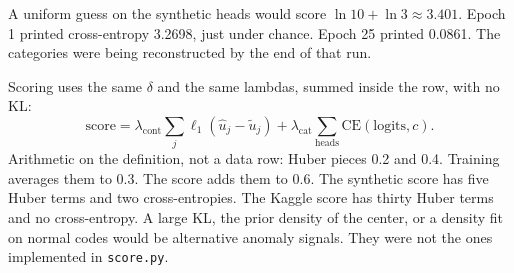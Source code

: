 \documentclass[11pt]{article}
\begin{document}
A uniform guess on the synthetic heads would score
$\ln 10 + \ln 3 \approx 3.401$. Epoch 1 printed cross-entropy 3.2698,
just under chance. Epoch 25 printed 0.0861. The categories were being
reconstructed by the end of that run.

Scoring uses the same $\delta$ and the same lambdas, summed inside the
row, with no KL:
\begin{equation}
\label{eq:score}
\mathrm{score}
= \lambda_{\mathrm{cont}}\sum_{j}\ell_{1}(\hat{u}_{j}-\tilde{u}_{j})
 + \lambda_{\mathrm{cat}}\sum_{\mathrm{heads}}\mathrm{CE}(\mathrm{logits}, c).
\end{equation}
Arithmetic on the definition, not a data row: Huber pieces 0.2 and 0.4.
Training averages them to 0.3. The score adds them to 0.6.
The synthetic score has five Huber terms and two cross-entropies.
The Kaggle score has thirty Huber terms and no cross-entropy.
A large KL, the prior density of the center, or a density fit on normal
codes would be alternative anomaly signals. They were not the ones
implemented in \texttt{score.py}.
\end{document}
